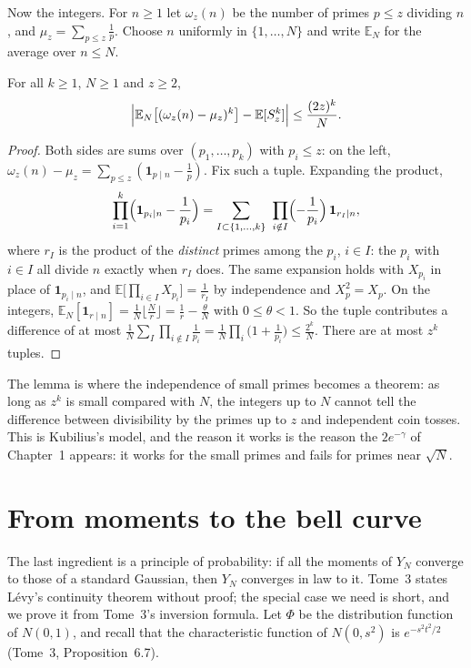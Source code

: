 Now the integers. For $n\ge1$ let $\omega_z(n)$ be the number of primes $p\le z$ dividing $n$, and $\mu_z=\sum_{p\le z}\frac1p$. Choose $n$ uniformly in $\{1,\dots,N\}$ and write $\mathbb E_N$ for the
average over $n\le N$.

\begin{lemma}\label{lem:compare}
For all $k\ge1$, $N\ge1$ and $z\ge2$,
\[
\Bigl|\mathbb E_N\bigl[(\omega_z(n)-\mu_z)^k\bigr]-\mathbb E[S_z^k]\Bigr|\le\frac{(2z)^k}N.
\]
\end{lemma}
\begin{proof}
Both sides are sums over $(p_1,\dots,p_k)$ with $p_i\le z$: on the left, $\omega_z(n)-\mu_z=\sum_{p\le z}(\mathbf 1_{p\mid n}-\frac1p)$. Fix such a tuple. Expanding the product,
\[
\prod_{i=1}^k\Bigl(\mathbf 1_{p_i\mid n}-\frac1{p_i}\Bigr)=\sum_{I\subset\{1,\dots,k\}}\ \prod_{i\notin I}\Bigl(-\frac1{p_i}\Bigr)\,\mathbf 1_{r_I\mid n},
\]
where $r_I$ is the product of the \emph{distinct} primes among the $p_i$, $i\in I$: the $p_i$ with $i\in I$ all divide $n$ exactly when $r_I$ does. The same expansion holds with $X_{p_i}$ in place of
$\mathbf 1_{p_i\mid n}$, and $\mathbb E\bigl[\prod_{i\in I}X_{p_i}\bigr]=\frac1{r_I}$ by independence and $X_p^2=X_p$. On the integers, $\mathbb E_N[\mathbf 1_{r\mid n}]=\frac1N\lfloor\frac Nr\rfloor=\frac1r-\frac\theta N$ with
$0\le\theta<1$. So the tuple contributes a difference of at most $\frac1N\sum_I\prod_{i\notin I}\frac1{p_i}=\frac1N\prod_i\bigl(1+\frac1{p_i}\bigr)\le\frac{2^k}N$. There are at most $z^k$ tuples.
\end{proof}

The lemma is where the independence of small primes becomes a theorem: as long as $z^k$ is small compared with $N$, the integers up to $N$ cannot tell the difference between
divisibility by the primes up to $z$ and independent coin tosses. This is Kubilius's model, and the reason it works is the reason the $2e^{-\gamma}$ of Chapter~1 appears: it works for the
small primes and fails for primes near $\sqrt N$.

\section{From moments to the bell curve}

The last ingredient is a principle of probability: if all the moments of $Y_N$ converge to those of a standard Gaussian, then $Y_N$ converges in law to it. Tome~3 states Lévy's
continuity theorem without proof; the special case we need is short, and we prove it from Tome~3's inversion formula. Let $\Phi$ be the distribution function of $N(0,1)$, and recall that
the characteristic function of $N(0,s^2)$ is $e^{-s^2t^2/2}$ (Tome~3, Proposition~6.7).

